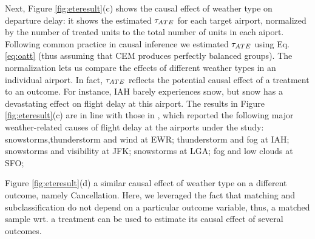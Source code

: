 


 


Next, Figure \ref{fig:eteresult}(c) shows the causal effect of weather
type on departure delay: it shows the estimated ${\tau_{ATE}}$ for each target
airport, normalized by the number of treated units to the total number
of units in each aiport.  Following common practice in causal
inference we estimated ${\tau_{ATE}}$ using Eq. \ref{eq:oatt} (thus assuming
that CEM produces perfectly balanced groups). The normalization lets
us compare the effects of different weather types in an individual
airport. In fact, ${\tau_{ATE}}$ reflects the potential causal effect of a
treatment to an outcome. For instance, IAH barely experiences snow,
but snow has a devastating effect on flight delay at this airport. The
results in Figure \ref{fig:eteresult}(c) are in line with those in
\cite{weather}, which reported the following major weather-related
causes of flight delay at the airports under the study:
snowstorms,thunderstorm and wind at EWR; thunderstorm and fog at IAH;
snowstorms and visibility at JFK; snowstorms at LGA; fog and low
clouds at SFO;


Figure \ref{fig:eteresult}(d) a similar causal effect of weather type
on a different outcome, namely Cancellation. Here, we leveraged the
fact that matching and subclassification do not depend on a particular
outcome variable, thus, a matched sample wrt. a treatment can be used
to estimate its causal effect of several outcomes.

















